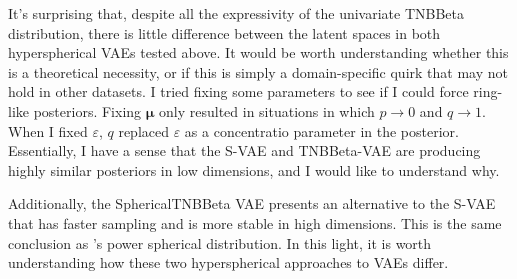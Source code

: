 It's surprising that, despite all the expressivity of the univariate TNBBeta distribution,
there is little difference between the latent spaces in both hyperspherical VAEs tested above.
It would be worth understanding whether this is a theoretical necessity, or if this is simply
a domain-specific quirk that may not hold in other datasets. I tried fixing some parameters
to see if I could force ring-like posteriors. Fixing $\boldsymbol{\mu}$ only resulted in
situations in which $p \to 0$ and $q \to 1$. When I fixed $\varepsilon$, $q$ replaced $\varepsilon$
as a concentratio parameter in the posterior. Essentially, I have a sense that the S-VAE and
TNBBeta-VAE are producing highly similar posteriors in low dimensions, and I would like to understand
why.

Additionally, the SphericalTNBBeta VAE presents an alternative to the S-VAE that has faster sampling
and is more stable in high dimensions. This is the same conclusion as \citep{decao2020powersphericaldistribution}'s
power spherical distribution. In this light, it is worth understanding how these two hyperspherical
approaches to VAEs differ.